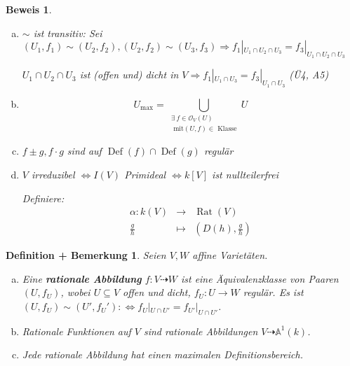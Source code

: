 \documentclass[a4paper, 12pt, numbers=noendperiod, chapterprefix=true, headsepline]{scrbook}
\theoremstyle{break}
\newtheorem{DefBem}[Def]{Definition + Bemerkung}
\theoremstyle{nonumberbreak}
\newtheorem{Bew}{Beweis}
\theoremstyle{nonumberplain}
\newcommand{\emp}[1]{\textbf{\emph{#1}}}
\newcommand{\deftermspec}[2]{{\index{#2}}\emp{#1}}
\DeclareMathOperator{\Ddef}{Def}%
\DeclareMathOperator{\Rat}{Rat}
\newcommand{\calO}{\mathcal{O}}
\begin{document}
\begin{Bew}\begin{enumerate}[a)]
\item
	$\sim$ ist transitiv: Sei $(U_1,f_1)\sim(U_2,f_2), (U_2,f_2)\sim(U_3,f_3) \Rightarrow f_1|_{U_1\cap U_2\cap U_3}=f_3|_{U_1\cap U_2\cap U_3}$
	
	$U_1\cap U_2 \cap U_3$ ist (offen und) \emph{dicht} in $V \Rightarrow f_1|_{U_1\cap U_3} = f_3|_{U_1\cap U_3}$ (\"U4, A5)
\item
	\[U_{\max}=\bigcup_{\substack{\exists\ f\in \calO_V(U)\\ \textrm{ mit} (U,f)\in \textrm{ Klasse}}} U\]
\item
	$f\pm g, f\cdot g$ sind auf $\Ddef(f)\cap\Ddef(g)$ regul\"ar
\item
	$V$ irreduzibel $\Leftrightarrow I(V)$ Primideal $\Leftrightarrow k[V]$ ist nullteilerfrei
	
	\emph{Definiere:}\[\begin{array}{rcl}
		\alpha:k(V) &\to& \Rat(V)\\
		\frac{g}{h} &\mapsto& (D(h),\frac{g}{h})\end{array}\]
	\end{enumerate}\end{Bew}

\begin{DefBem}\label{bem7.2}
Seien $V,W$ affine Variet\"aten.\begin{enumerate}[a)]
\item
	Eine \deftermspec{rationale Abbildung}{Abbildung!rationale-} $f:V\dashrightarrow W$ ist eine \"Aquivalenzklasse von Paaren $(U,f_U)$, wobei $U\subseteq V$ offen und dicht, $f_U:U\longrightarrow W$ regul\"ar. Es ist $(U,f_U)\sim (U',f_U'):\Leftrightarrow f_U|_{U\cap U'}=f_{U'}|_{U\cap U'}$.
\item
	Rationale Funktionen auf $V$ sind rationale Abbildungen $V\dashrightarrow \mathbb A^1(k)$.
\item
	Jede rationale Abbildung hat einen maximalen Definitionsbereich.
\end{enumerate}\end{DefBem}
\end{document}
